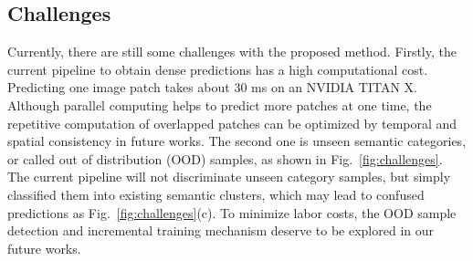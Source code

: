 \documentclass[letterpaper, 10 pt, conference]{ieeeconf}  %
\begin{document}
	\subsection{Challenges}
	Currently, there are still some challenges with the proposed method. Firstly, the current pipeline to obtain dense predictions has a high computational cost. Predicting one image patch takes about 30 ms on an NVIDIA TITAN X. Although parallel computing helps to predict more patches at one time, the repetitive computation of overlapped patches can be optimized by temporal and spatial consistency in future works.
	The second one is unseen semantic categories, or called out of distribution (OOD) samples, as shown in Fig.~\ref{fig:challenges}. The current pipeline will not discriminate unseen category samples, but simply classified them into existing semantic clusters, which may lead to confused predictions as Fig.~\ref{fig:challenges}(c). To minimize labor costs, the OOD sample detection and incremental training mechanism deserve to be explored in our future works.
	
	
	
\end{document}
